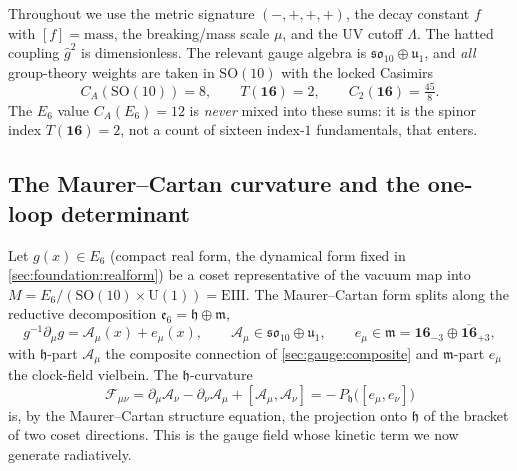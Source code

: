 \documentclass[11pt]{article}
\theoremstyle{plain}
\theoremstyle{definition}
\theoremstyle{remark}
\newcommand{\SO}[1]{\mathrm{SO}(#1)}
\newcommand{\U}[1]{\mathrm{U}(#1)}
\newcommand{\SOTen}{\SO{10}}
\newcommand{\UOne}{\U{1}}
\newcommand{\ghat}{\hat g}
\begin{document}
Throughout we use the metric signature $(-,+,+,+)$, the decay constant
$f$ with $[f]=\text{mass}$, the breaking/mass scale $\mu$, and the UV
cutoff $\Lambda$. The hatted coupling $\ghat^{2}$ is dimensionless. The
relevant gauge algebra is $\mathfrak{so}_{10}\oplus\mathfrak u_{1}$, and
\emph{all} group-theory weights are taken in $\SOTen$ with the locked
Casimirs
\begin{equation}\label{eq:app-ym:casimirs}
  C_{A}(\SOTen)=8,\qquad
  T(\mathbf{16})=2,\qquad
  C_{2}(\mathbf{16})=\tfrac{45}{8}.
\end{equation}
The $E_{6}$ value $C_{A}(E_{6})=12$ is \emph{never} mixed into these
sums: it is the spinor index $T(\mathbf{16})=2$, not a count of sixteen
index-$1$ fundamentals, that enters.

\subsection{The Maurer--Cartan curvature and the one-loop determinant}
\label{sec:app-ym:setup}

Let $g(x)\in E_{6}$ (compact real form, the dynamical form fixed in
\autoref{sec:foundation:realform}) be a coset representative of the
vacuum map into $M=E_{6}/(\SOTen\times\UOne)=\mathrm{EIII}$. The
Maurer--Cartan form splits along the reductive decomposition
$\mathfrak e_{6}=\mathfrak h\oplus\mathfrak m$,
\begin{equation}\label{eq:app-ym:MC}
  g^{-1}\partial_{\mu}g
  = \mathcal A_{\mu}(x) + e_{\mu}(x),
  \qquad
  \mathcal A_{\mu}\in\mathfrak{so}_{10}\oplus\mathfrak u_{1},
  \qquad
  e_{\mu}\in\mathfrak m
  =\mathbf{16}_{-3}\oplus\overline{\mathbf{16}}_{+3},
\end{equation}
with $\mathfrak h$-part $\mathcal A_{\mu}$ the composite connection of
\autoref{sec:gauge:composite} and $\mathfrak m$-part $e_{\mu}$ the
clock-field vielbein. The $\mathfrak h$-curvature
\begin{equation}\label{eq:app-ym:curv}
  \mathcal F_{\mu\nu}
  =\partial_{\mu}\mathcal A_{\nu}-\partial_{\nu}\mathcal A_{\mu}
   +[\mathcal A_{\mu},\mathcal A_{\nu}]
  =-\,P_{\mathfrak h}\bigl([e_{\mu},e_{\nu}]\bigr)
\end{equation}
is, by the Maurer--Cartan structure equation, the projection onto
$\mathfrak h$ of the bracket of two coset directions. This is the gauge
field whose kinetic term we now generate radiatively.
\end{document}
